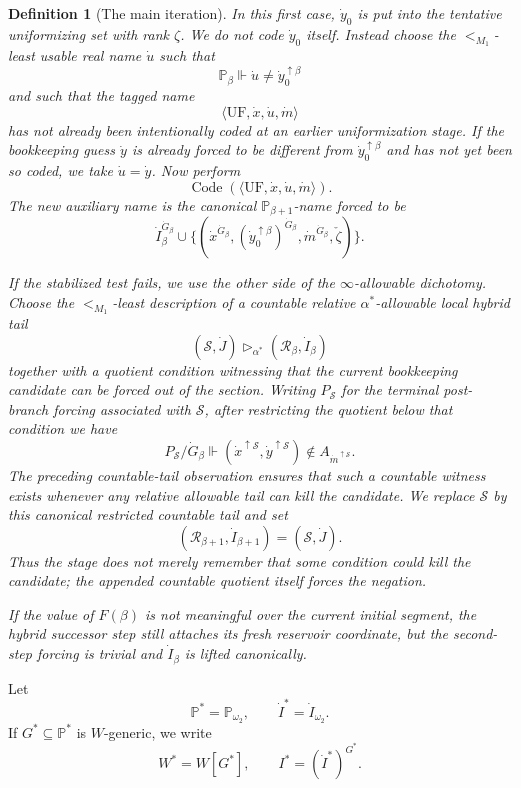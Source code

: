 \documentclass[a4paper,11pt]{article}
\newtheorem{definition}[theorem]{Definition}
\begin{document}
\begin{definition}[The main iteration]
In this first case, $\dot y_0$ is put into the tentative uniformizing set with rank $\zeta$.  We do not code $\dot y_0$ itself.  Instead choose the $<_{M_1}$-least usable real name $\dot u$ such that
\[
   \mathbb P_\beta\Vdash
   \dot u\neq \dot y_0^{\uparrow\beta}
\]
and such that the tagged name
\[
   \langle\mathrm{UF},\dot x,
      \dot u,
      \dot m\rangle
\]
has not already been intentionally coded at an earlier uniformization stage.  If the bookkeeping guess $\dot y$ is already forced to be different from $\dot y_0^{\uparrow\beta}$ and has not yet been so coded, we take $\dot u=\dot y$.  Now perform
\[
   \operatorname{Code}(\langle\mathrm{UF},\dot x,
      \dot u,
      \dot m\rangle).
\]
The new auxiliary name is the canonical $\mathbb P_{\beta+1}$-name forced to be
\[
   \dot I_\beta^{\dot G_\beta}
   \cup
   \{(\dot x^{\dot G_\beta},
       (\dot y_0^{\uparrow\beta})^{\dot G_\beta},
       \dot m^{\dot G_\beta},
       \check\zeta)
     \}.
\]

If the stabilized test fails, we use the other side of the $\infty$-allowable dichotomy.  Choose the $<_{M_1}$-least description of a countable relative $\alpha^\ast$-allowable local hybrid tail
\[
   (\mathcal S,
   \dot J)\triangleright_{\alpha^\ast}
   (\mathcal R_\beta,
   \dot I_\beta)
\]
together with a quotient condition witnessing that the current bookkeeping candidate can be forced out of the section.  Writing $P_{\mathcal S}$ for the terminal post-branch forcing associated with $\mathcal S$, after restricting the quotient below that condition we have
\[
   P_{\mathcal S}/\dot G_\beta
   \Vdash
   (\dot x^{\uparrow\mathcal S},
    \dot y^{\uparrow\mathcal S})
      \notin A_{\dot m^{\uparrow\mathcal S}}.
\]
The preceding countable-tail observation ensures that such a countable witness exists whenever any relative allowable tail can kill the candidate.  We replace $\mathcal S$ by this canonical restricted countable tail and set
\[
   (\mathcal R_{\beta+1},\dot I_{\beta+1})=(\mathcal S,
   \dot J).
\]
Thus the stage does not merely remember that some condition could kill the candidate; the appended countable quotient itself forces the negation.

If the value of $F(\beta)$ is not meaningful over the current initial segment, the hybrid successor step still attaches its fresh reservoir coordinate, but the second-step forcing is trivial and $\dot I_\beta$ is lifted canonically.
\end{definition}

Let
\[
   \mathbb P^\ast=\mathbb P_{\omega_2},
   \qquad
   \dot I^\ast=\dot I_{\omega_2}.
\]
If $G^\ast\subseteq\mathbb P^\ast$ is $W$-generic, we write
\[
   W^\ast=W[G^\ast],
   \qquad
   I^\ast=(\dot I^\ast)^{G^\ast}.
\]
\end{document}
